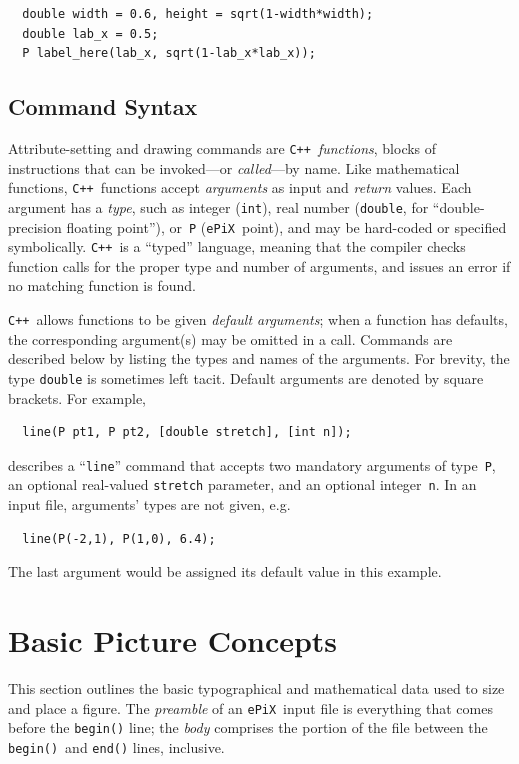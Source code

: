 \documentclass[12pt]{report}
\newcommand{\code}[1]{\texttt{#1}}
\newcommand{\ePiX}{\code{ePiX}}
\newcommand{\CXX}{\code{C++}}
\begin{document}
\begin{footnotesize}
\begin{verbatim}
  double width = 0.6, height = sqrt(1-width*width);
  double lab_x = 0.5;
  P label_here(lab_x, sqrt(1-lab_x*lab_x));
\end{verbatim}
\end{footnotesize}


\subsection*{Command Syntax}

Attribute-setting and drawing commands are \CXX\ \emph{functions},
blocks of instructions that can be invoked---or \emph{called}---by
name. Like mathematical functions, \CXX\ functions accept
\emph{arguments} as input and \emph{return} values.  Each argument has
a \emph{type}, such as integer (\code{int}), real number
(\code{double}, for ``double-precision floating point''), or~\code{P}
(\ePiX\ point), and may be hard-coded or specified symbolically. \CXX\ 
is a ``typed'' language, meaning that the compiler checks function
calls for the proper type and number of arguments, and issues an error
if no matching function is found.

\CXX\ allows functions to be given \emph{default arguments}; when a
function has defaults, the corresponding argument(s) may be omitted in
a call. Commands are described below by listing the types and names of
the arguments. For brevity, the type \code{double} is sometimes left
tacit.  Default arguments are denoted by square brackets. For example,
\begin{verbatim}
  line(P pt1, P pt2, [double stretch], [int n]);
\end{verbatim}
describes a ``\code{line}'' command that accepts two mandatory
arguments of type~\code{P}, an optional real-valued \code{stretch}
parameter, and an optional integer~\code{n}. In an input file,
arguments' types are not given, e.g.
\begin{verbatim}
  line(P(-2,1), P(1,0), 6.4);
\end{verbatim}
The last argument would be assigned its default value in this example.


\section{Basic Picture Concepts}

This section outlines the basic typographical and mathematical data
used to size and place a figure. The \emph{preamble}
of an \ePiX\ input file is everything that comes before the
\code{begin()} line; the \emph{body} comprises the portion of the file
between the \code{begin()}~and \code{end()} lines, inclusive.
\end{document}
